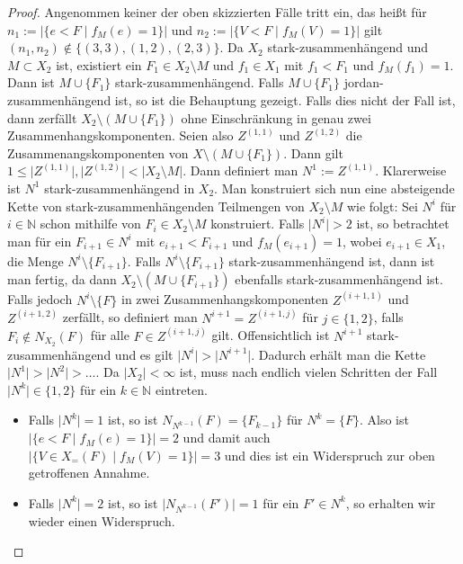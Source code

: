\documentclass[12pt,titlepage]{article}
\begin{document}
\begin{proof}
Angenommen keiner der oben skizzierten Fälle tritt ein, das heißt für $n_1:= \vert\{e <F \mid f_M(e)=1\}\vert$ und $n_2:=\vert \{V<F \mid f_M(V)=1\}\vert$ gilt $(n_1,n_2)\notin \{(3,3),(1,2),(2,3)\}$. Da $X_2$ stark-zusammenhängend und $M \subset X_2$ ist, existiert ein $F_1\in X_2\setminus M$ und $f_1 \in X_1$ mit $f_1<F_1$ und $f_M(f_1)=1$. Dann ist $M \cup \{F_1\}$ stark-zusammenhängend. Falls $M \cup \{F_1\}$ jordan-zusammenhängend ist, so ist die Behauptung gezeigt. Falls dies nicht der Fall ist, dann zerfällt $X_2 \setminus (M \cup \{F_1\})$  ohne Einschränkung in genau zwei  Zusammenhangskomponenten. Seien also $Z^{(1,1)}$ und $Z^{(1,2)}$ die Zusammenangskomponenten von $X\setminus (M \cup \{F_1\})$. Dann gilt $1\leq \vert Z^{(1,1)}\vert,\vert Z^{(1,2)}\vert < \vert X_2\setminus M\vert$. Dann definiert man $N^1:=Z^{(1,1)}$. Klarerweise ist $N^1$ stark-zusammenhängend in $X_2$. Man konstruiert sich nun eine absteigende Kette von stark-zusammenhängenden Teilmengen von $X_2\setminus M$  wie folgt:
Sei $N^i$ für $i \in \mathbb{N}$ schon mithilfe von $F_i\in X_2\setminus M$ konstruiert. Falls  $\vert N^i \vert>2$ ist, so betrachtet man für ein $F_{i+1}\in N^i$ mit $e_{i+1}<F_{i+1}$ und $f_M(e_{i+1})=1$, wobei $e_{i+1} \in X_1$, die Menge $N^i\setminus \{F_{i+1}\}$. 
Falls $N^i \setminus \{F_{i+1}\}$ stark-zusammenhängend ist, dann ist man fertig, da dann $X_2\setminus (M \cup \{F_{i+1}\})$ ebenfalls stark-zusammenhängend ist.
 Falls jedoch $N^i \setminus \{F\}$ in zwei Zusammenhangskomponenten $Z^{(i+1,1)}$ und $Z^{(i+1,2)}$ zerfällt, so definiert man $N^{i+1}=Z^{(i+1,j)}$  für $j \in \{1,2\}$, falls $F_{i} \notin N_{X_2}(F)$ für  alle $F \in Z^{(i+1,j)}$ gilt. Offensichtlich ist $N^{i+1}$ stark-zusammenhängend und es gilt $\vert N^{i}\vert >\vert N^{i+1} \vert$. Dadurch erhält man die Kette $\vert N^1 \vert>\vert  N^2 \vert> \ldots$. Da $\vert X_2\vert < \infty$ ist, muss nach endlich vielen Schritten der Fall $\vert N^k \vert \in \{1,2\}$ für ein $k \in \mathbb{N}$ eintreten.
 \begin{itemize}
 \item Falls $\vert N^k \vert=1$ ist, so ist $N_{N^{k-1}}(F)=\{F_{k-1}\}$ für $N^k=\{F\}$. Also ist $\vert \{e<F \mid f_M(e)=1\}\vert =2 $ und damit auch $\vert \{V\in X_=(F) \mid f_M(V)=1\} \vert=3$ und dies ist ein Widerspruch zur oben getroffenen Annahme.
 \item Falls $\vert N^k \vert=2$ ist, so ist $\vert N_{N^{k-1}}(F')\vert =1$ für ein $F' \in N^k$, so erhalten wir wieder einen Widerspruch.
\end{itemize}
\end{proof}
\end{document}
